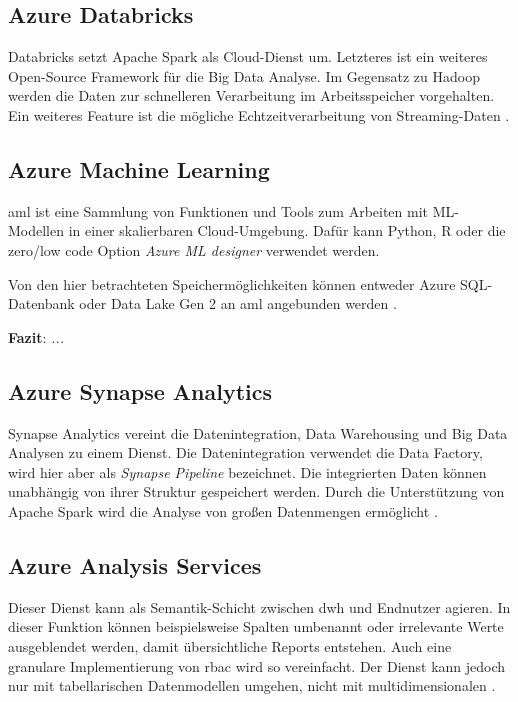 \subsection{Azure Databricks} \label{sec:grundlagen:azure_dienste:databricks}
Databricks setzt Apache Spark als Cloud-Dienst um. Letzteres ist ein weiteres Open-Source Framework für die Big Data Analyse. Im Gegensatz zu Hadoop werden die Daten zur schnelleren Verarbeitung im Arbeitsspeicher vorgehalten. Ein weiteres Feature ist die mögliche Echtzeitverarbeitung von Streaming-Daten \cite{soh_data_2020}.

\subsection{Azure Machine Learning} \label{sec:grundlagen:azure_dienste:machineLearning}
\ac{aml} ist eine Sammlung von Funktionen und Tools zum Arbeiten mit ML-Modellen in einer skalierbaren Cloud-Umgebung. Dafür kann Python, R oder die zero/low code Option \textit{Azure ML designer} verwendet werden.

Von den hier betrachteten Speichermöglichkeiten können entweder Azure SQL-Datenbank oder Data Lake Gen 2 an \ac{aml} angebunden werden \cite{soh_data_2020}.

\textbf{Fazit}: \textit{...}

\subsection{Azure Synapse Analytics} \label{sec:grundlagen:azure_dienste:synapseAnalytics}
Synapse Analytics vereint die Datenintegration, Data Warehousing und Big Data Analysen zu einem Dienst. Die Datenintegration verwendet die Data Factory, wird hier aber als \textit{Synapse Pipeline} bezeichnet. Die integrierten Daten können unabhängig von ihrer Struktur gespeichert werden. Durch die Unterstützung von Apache Spark wird die Analyse von großen Datenmengen ermöglicht \cite{shiyal_beginning_2021}.

\subsection{Azure Analysis Services} \label{sec:grundlagen:azure_dienste:analysisServices}
Dieser Dienst kann als Semantik-Schicht zwischen \ac{dwh} und Endnutzer agieren. In dieser Funktion können beispielsweise Spalten umbenannt oder irrelevante Werte ausgeblendet werden, damit übersichtliche Reports entstehen. Auch eine granulare Implementierung von \ac{rbac} wird so vereinfacht. Der Dienst kann jedoch nur mit tabellarischen Datenmodellen umgehen, nicht mit multidimensionalen \cite{how_beyond_2020}.

